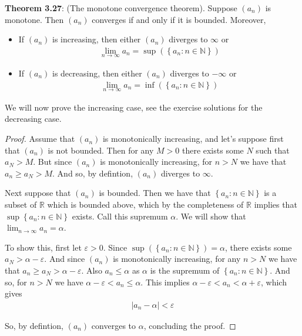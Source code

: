 \documentclass{article}
\begin{document}
\textbf{Theorem 3.27}: (The monotone convergence theorem). Suppose $(a_n)$ is monotone. Then $(a_n)$ converges if
and only if it is bounded. Moreover,
\begin{itemize}
	\item If $(a_n)$ is increasing, then either $(a_n)$ diverges to $\infty$ or
	      \begin{align*}
		      \lim_{n \rightarrow \infty} a_n = \sup\left(\left\{a_n : n \in \mathbb{N}\right\}\right)
	      \end{align*}
	\item If $(a_n)$ is decreasing, then either $(a_n)$ diverges to $-\infty$ or
	      \begin{align*}
		      \lim_{n \rightarrow \infty} a_n = \inf\left(\left\{a_n : n \in \mathbb{N}\right\}\right)
	      \end{align*}
\end{itemize}
We will now prove the increasing case, see the exercise solutions for the decreasing case.
\begin{proof}
	Assume that $(a_n)$ is monotonically increasing, and let's suppose first that $(a_n)$ is not bounded. Then for any $M > 0$
	there exists some $N$ such that $a_N > M$. But since $(a_n)$ is monotonically increasing, for $n > N$ we have that $a_n \ge a_{N} > M$.
	And so, by defintion, $(a_n)$ diverges to $\infty$.

	Next suppose that $(a_n)$ is bounded. Then we have that $\left\{a_n : n \in \mathbb{N}\right\}$ is a subset of $\mathbb{R}$ which is bounded above,
	which by the completeness of $\mathbb{R}$ implies that $\sup\left\{a_n : n \in \mathbb{N}\right\}$ exists. Call this supremum $\alpha$. We will show
	that $\lim_{n \rightarrow \infty} a_n = \alpha$.

	To show this, first let $\varepsilon > 0$. Since $\sup\left(\left\{a_n : n \in \mathbb{N}\right\}\right) = \alpha$, there exists some
	$a_N > \alpha - \varepsilon$. And since $(a_n)$ is monotonically increasing, for any $n > N$ we have that $a_n \ge a_N > \alpha - \varepsilon$.
	Also $a_n \le \alpha$ as $\alpha$ is the supremum of $\left\{a_n : n \in \mathbb{N}\right\}$. And so, for $n > N$ we have $\alpha - \varepsilon < a_n \le \alpha$.
	This implies $\alpha - \varepsilon < a_n < \alpha + \varepsilon$, which gives
	\begin{align*}
		|a_n - \alpha| < \varepsilon
	\end{align*}

	So, by defintion, $(a_n)$ converges to $\alpha$, concluding the proof.
\end{proof}
\end{document}
